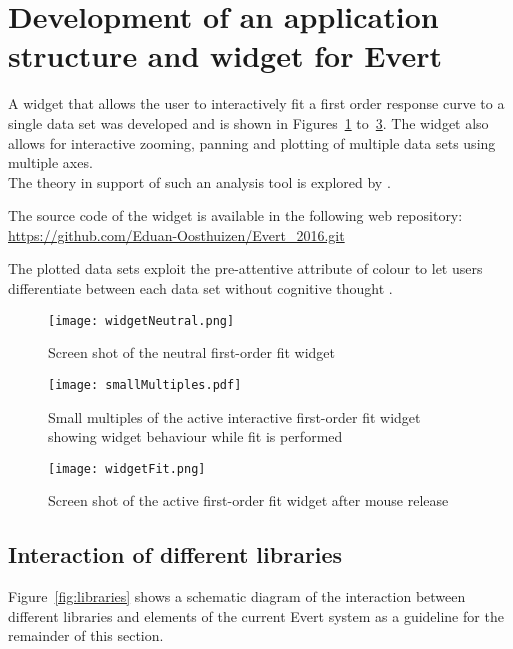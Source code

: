 \documentclass[a4paper,12pt]{article}
\begin{document}
\section{Development of an application structure and widget for Evert}
A widget that allows the user to interactively fit a first order response curve to a single data set was developed and is shown in Figures~\ref{fig:widget_overview_neutral} to~\ref{fig:widget_overview_select}. The widget also allows for interactive zooming, panning and plotting of multiple data sets using multiple axes.\\The theory in support of such an analysis tool is explored by \citet{oos_wil}.

The source code of the widget is available in the following web repository: \url{https://github.com/Eduan-Oosthuizen/Evert_2016.git}

The plotted data sets exploit the pre-attentive attribute of colour to let users differentiate between each data set without cognitive thought \citep{oos_wil}.

\begin{figure}[htbp]
  \centering
  \texttt{[image: widgetNeutral.png]}
  \caption[Neutral first-order fit widget]{Screen shot of the neutral first-order fit widget}
  \label{fig:widget_overview_neutral}
\end{figure}

\begin{figure}[htbp]
  \centering
  \texttt{[image: smallMultiples.pdf]}
  \caption[Small multiples of interactive fit response]{Small multiples of the active interactive first-order fit widget showing widget behaviour while fit is performed}
  \label{fig:widget_smallMultiples}
\end{figure}

\begin{figure}[htbp]
  \centering
  \texttt{[image: widgetFit.png]}
  \caption[Active first-order fit widget]{Screen shot of the active first-order fit widget after mouse release}
 \label{fig:widget_overview_select}
\end{figure}

\subsection{Interaction of different libraries}
Figure~\ref{fig:libraries} shows a schematic diagram of the interaction between different libraries and elements of the current Evert system as a guideline for the remainder of this section.
\end{document}
